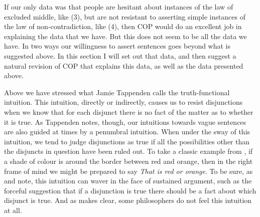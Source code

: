 If our only data was that people are hesitant about instances of the law of excluded middle, like (3), but are not resistant to asserting simple instances of the law of non-contradiction, like (4), then COP would do an excellent job in explaining the data that we have. But this does not seem to be all the data we have. In two ways our willingness to assert sentences goes beyond what is suggested above. In this section I will set out that data, and then suggest a natural revision of COP that explains this data, as well as the data presented above.

Above we have stressed what Jamie Tappenden calls the truth-functional intuition. This intuition, directly or indirectly, causes us to resist disjunctions when we know that for each disjunct there is no fact of the matter as to whether it is true. As Tappenden notes, though, our intuitions towards vague sentences are also guided at times by a penumbral intuition. When under the sway of this intuition, we tend to judge disjunctions as true if all the possibilities other than the disjuncts in question have been ruled out. To take a classic example from \citet{Fine1975a}, if a shade of colour is around the border between red and orange, then in the right frame of mind we might be prepared to say \textit{That is red or orange}. To be sure, as \citet{Tye1990} and \citet{Tappenden1993} note, this intuition can waver in the face of sustained argument, such as the forceful suggestion that if a disjunction is true there should be a fact about which disjunct is true. And as \citet{Machina1976} makes clear, some philosophers do not feel this intuition at all.

